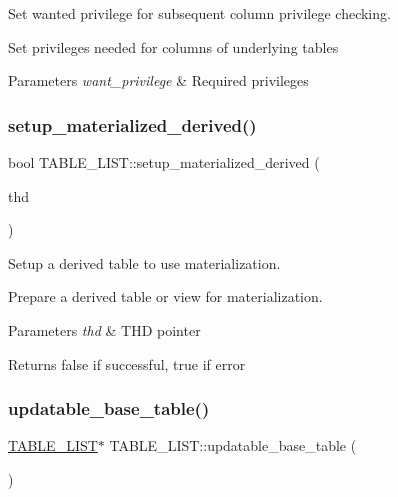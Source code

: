 Set wanted privilege for subsequent column privilege checking. 

Set privileges needed for columns of underlying tables


\begin{DoxyParams}{Parameters}
{\em want\+\_\+privilege} & Required privileges \\
\hline
\end{DoxyParams}
\mbox{\label{structTABLE__LIST_a4ff020da993f79b875da85e2e68a3f81}} 
\subsubsection{\texorpdfstring{setup\+\_\+materialized\+\_\+derived()}{setup\_materialized\_derived()}}
{\footnotesize\ttfamily bool T\+A\+B\+L\+E\+\_\+\+L\+I\+S\+T\+::setup\+\_\+materialized\+\_\+derived (\begin{DoxyParamCaption}\item[{T\+HD $\ast$}]{thd }\end{DoxyParamCaption})}



Setup a derived table to use materialization. 

Prepare a derived table or view for materialization.


\begin{DoxyParams}{Parameters}
{\em thd} & T\+HD pointer\\
\hline
\end{DoxyParams}
\begin{DoxyReturn}{Returns}
false if successful, true if error 
\end{DoxyReturn}
\mbox{\label{structTABLE__LIST_a3368e5b0a9c43522662435379e71acc7}} 
\subsubsection{\texorpdfstring{updatable\+\_\+base\+\_\+table()}{updatable\_base\_table()}}
{\footnotesize\ttfamily \mbox{\hyperlink{structTABLE__LIST}{T\+A\+B\+L\+E\+\_\+\+L\+I\+ST}}$\ast$ T\+A\+B\+L\+E\+\_\+\+L\+I\+S\+T\+::updatable\+\_\+base\+\_\+table (\begin{DoxyParamCaption}{ }\end{DoxyParamCaption})\hspace{0.3cm}{\ttfamily [inline]}}

